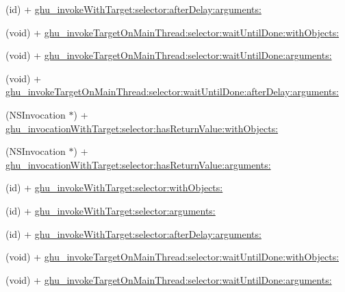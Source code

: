 \begin{DoxyCompactItemize}
\item 
(id) + \hyperlink{interface_n_s_invocation_07_g_h_utils___g_h_u_n_i_t_08_a7f856b1af207762c610e597941411091}{ghu\-\_\-invoke\-With\-Target\-:selector\-:after\-Delay\-:arguments\-:}
\item 
(void) + \hyperlink{interface_n_s_invocation_07_g_h_utils___g_h_u_n_i_t_08_a6933a1f0fd7d0d4b8f133baf53f30a31}{ghu\-\_\-invoke\-Target\-On\-Main\-Thread\-:selector\-:wait\-Until\-Done\-:with\-Objects\-:}
\item 
(void) + \hyperlink{interface_n_s_invocation_07_g_h_utils___g_h_u_n_i_t_08_a261cd5aa6061478716fba4f79cb4f69b}{ghu\-\_\-invoke\-Target\-On\-Main\-Thread\-:selector\-:wait\-Until\-Done\-:arguments\-:}
\item 
(void) + \hyperlink{interface_n_s_invocation_07_g_h_utils___g_h_u_n_i_t_08_a0b891f27c084f6677907e0f907caf5f9}{ghu\-\_\-invoke\-Target\-On\-Main\-Thread\-:selector\-:wait\-Until\-Done\-:after\-Delay\-:arguments\-:}
\item 
(\-N\-S\-Invocation $\ast$) + \hyperlink{interface_n_s_invocation_07_g_h_utils___g_h_u_n_i_t_08_a31d3598ec7e21face3cb783c2c60b42c}{ghu\-\_\-invocation\-With\-Target\-:selector\-:has\-Return\-Value\-:with\-Objects\-:}
\item 
(\-N\-S\-Invocation $\ast$) + \hyperlink{interface_n_s_invocation_07_g_h_utils___g_h_u_n_i_t_08_a64dcd5d1f117118b02213db0846092d9}{ghu\-\_\-invocation\-With\-Target\-:selector\-:has\-Return\-Value\-:arguments\-:}
\item 
(id) + \hyperlink{interface_n_s_invocation_07_g_h_utils___g_h_u_n_i_t_08_af60de644c62297e237a21adf2ea75e80}{ghu\-\_\-invoke\-With\-Target\-:selector\-:with\-Objects\-:}
\item 
(id) + \hyperlink{interface_n_s_invocation_07_g_h_utils___g_h_u_n_i_t_08_a0aa9a0433b00c60a8174c7bed363821f}{ghu\-\_\-invoke\-With\-Target\-:selector\-:arguments\-:}
\item 
(id) + \hyperlink{interface_n_s_invocation_07_g_h_utils___g_h_u_n_i_t_08_a7f856b1af207762c610e597941411091}{ghu\-\_\-invoke\-With\-Target\-:selector\-:after\-Delay\-:arguments\-:}
\item 
(void) + \hyperlink{interface_n_s_invocation_07_g_h_utils___g_h_u_n_i_t_08_a6933a1f0fd7d0d4b8f133baf53f30a31}{ghu\-\_\-invoke\-Target\-On\-Main\-Thread\-:selector\-:wait\-Until\-Done\-:with\-Objects\-:}
\item 
(void) + \hyperlink{interface_n_s_invocation_07_g_h_utils___g_h_u_n_i_t_08_a261cd5aa6061478716fba4f79cb4f69b}{ghu\-\_\-invoke\-Target\-On\-Main\-Thread\-:selector\-:wait\-Until\-Done\-:arguments\-:}

\end{DoxyCompactItemize}
